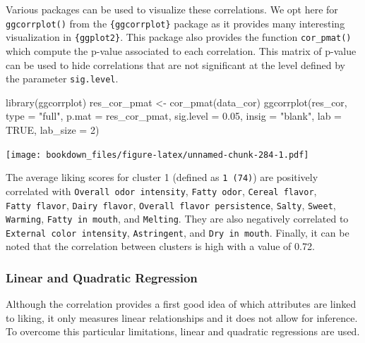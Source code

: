 \documentclass[
]{krantz}
\makeatletter
\newenvironment{Shaded}{\begin{snugshade}}{\end{snugshade}}
\newcommand{\AttributeTok}[1]{\textcolor[rgb]{0.61,0.61,0.61}{#1}}
\newcommand{\ConstantTok}[1]{\textcolor[rgb]{0,0,0}{#1}}
\newcommand{\DecValTok}[1]{\textcolor[rgb]{0.06,0.06,0.06}{#1}}
\newcommand{\FloatTok}[1]{\textcolor[rgb]{0.06,0.06,0.06}{#1}}
\newcommand{\FunctionTok}[1]{\textcolor[rgb]{0,0,0}{#1}}
\newcommand{\NormalTok}[1]{#1}
\newcommand{\OtherTok}[1]{\textcolor[rgb]{0.37,0.37,0.37}{#1}}
\newcommand{\StringTok}[1]{\textcolor[rgb]{0.5,0.5,0.5}{#1}}
\newenvironment{kframe}{%
\medskip{}
\setlength{\fboxsep}{.8em}
 \def\at@end@of@kframe{}%
 \ifinner\ifhmode%
  \def\at@end@of@kframe{\end{minipage}}%
  \begin{minipage}{\columnwidth}%
 \fi\fi%
 \def\FrameCommand##1{\hskip\@totalleftmargin \hskip-\fboxsep
 \colorbox{shadecolor}{##1}\hskip-\fboxsep
     \hskip-\linewidth \hskip-\@totalleftmargin \hskip\columnwidth}%
 \MakeFramed {\advance\hsize-\width
   \@totalleftmargin\z@ \linewidth\hsize
   \@setminipage}}%
 {\par\unskip\endMakeFramed%
 \at@end@of@kframe}
\renewenvironment{Shaded}{\begin{kframe}}{\end{kframe}}
\makeatother
\begin{document}
Various packages can be used to visualize these correlations. We opt here for \texttt{ggcorrplot()} from the \texttt{\{ggcorrplot\}} package as it provides many interesting visualization in \texttt{\{ggplot2\}}. This package also provides the function \texttt{cor\_pmat()} which compute the p-value associated to each correlation. This matrix of p-value can be used to hide correlations that are not significant at the level defined by the parameter \texttt{sig.level}.

\begin{Shaded}
\begin{Highlighting}[]
\FunctionTok{library}\NormalTok{(ggcorrplot)}
\NormalTok{res\_cor\_pmat }\OtherTok{\textless{}{-}} \FunctionTok{cor\_pmat}\NormalTok{(data\_cor)}
\FunctionTok{ggcorrplot}\NormalTok{(res\_cor, }\AttributeTok{type =} \StringTok{"full"}\NormalTok{, }\AttributeTok{p.mat =}\NormalTok{ res\_cor\_pmat, }\AttributeTok{sig.level =} \FloatTok{0.05}\NormalTok{, }\AttributeTok{insig =} \StringTok{"blank"}\NormalTok{, }\AttributeTok{lab =} \ConstantTok{TRUE}\NormalTok{, }\AttributeTok{lab\_size =} \DecValTok{2}\NormalTok{)}
\end{Highlighting}
\end{Shaded}

\texttt{[image: bookdown\_files/figure-latex/unnamed-chunk-284-1.pdf]}

The average liking scores for cluster 1 (defined as \texttt{1\ (74)}) are positively correlated with \texttt{Overall\ odor\ intensity}, \texttt{Fatty\ odor}, \texttt{Cereal\ flavor}, \texttt{Fatty\ flavor}, \texttt{Dairy\ flavor}, \texttt{Overall\ flavor\ persistence}, \texttt{Salty}, \texttt{Sweet}, \texttt{Warming}, \texttt{Fatty\ in\ mouth}, and \texttt{Melting}. They are also negatively correlated to \texttt{External\ color\ intensity}, \texttt{Astringent}, and \texttt{Dry\ in\ mouth}.
Finally, it can be noted that the correlation between clusters is high with a value of 0.72.

\hypertarget{linear-and-quadratic-regression}{%
\subsubsection{Linear and Quadratic Regression}\label{linear-and-quadratic-regression}}

Although the correlation provides a first good idea of which attributes are linked to liking, it only measures linear relationships and it does not allow for inference. To overcome this particular limitations, linear and quadratic regressions are used.
\end{document}
